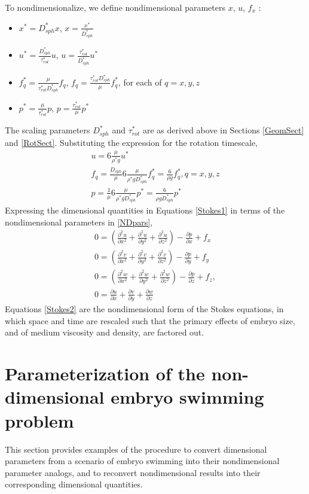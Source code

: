 \documentclass[10pt,a4paper]{article}
\def\non{\nonumber}
\def\p{\partial}
\begin{document}
To nondimensionalize, we define nondimensional parameters $x$, $u$, $f_x$ :
\begin{itemize}
	\item $x^* = D_{sph}^* x$, $x = \frac{x^*}{D_{sph}^*}$
	\item $u^* = \frac{D_{sph}^*}{\tau_{rot}^*} u$, $u = \frac{\tau_{rot}^*}{D_{sph}^*} u^*$
	\item $f_q^* = \frac{\mu}{\tau_{rot}^* D_{sph}^*} f_q$, $f_q = \frac{\tau_{rot}^* D_{sph}^*}{\mu} f_q^*$, for each of $q = x, y, z$
	\item $p^* = \frac{\mu}{\tau_{rot}^*} p$, $p = \frac{\tau_{rot}^*}{\mu} p^*$
\end{itemize}
The scaling parameters $D_{sph}^*$ and $\tau_{rot}^*$ are as derived above in Sections \ref{GeomSect} and \ref{RotSect}.
Substituting the expression for the rotation timescale,
\begin{eqnarray}\label{NDpars}
	u = 6 \frac{\mu}{\rho^* g } u^* \non \\
	f_q = \frac{D_{sph}}{\mu} 6 \frac{\mu}{\rho^* g D_{sph}^*} f_q^* = \frac{6}{\rho g} f_q^*, q = x, y, z \non \\
	p = \frac{1}{\mu} 6 \frac{\mu}{\rho^* g D_{sph}^*} p^* = \frac{6}{\rho g D_{sph}^*} p^*
\end{eqnarray}
Expressing the dimensional quantities in Equations \ref{Stokes1} in terms of the nondimensional parameters in \ref{NDpars}, 
\begin{eqnarray}\label{Stokes2}
	0 = \left( \frac{\p^2 u}{\p x^2}+\frac{\p^2 u}{\p y^2}+\frac{\p^2 u}{\p z^2} \right) - \frac{\p p}{\p x} + f_x \non \\
	0 = \left( \frac{\p^2 v}{\p x^2}+\frac{\p^2 v}{\p y^2}+\frac{\p^2 v}{\p z^2} \right) - \frac{\p p}{\p y} + f_y \non \\
	0 = \left( \frac{\p^2 w}{\p x^2}+\frac{\p^2 w}{\p y^2}+\frac{\p^2 w}{\p z^2} \right) - \frac{\p p}{\p z} + f_z , \non \\
	0 =  \frac{\p u}{\p {x}}+\frac{\p v}{\p {y}}+\frac{\p w}{\p {z}}
\end{eqnarray}
Equations \ref{Stokes2} are the nondimensional form of the Stokes equations, in which space and time are rescaled such that the primary effects of embryo size, and of medium viscosity and density, are factored out.  

\section{Parameterization of the non-dimensional embryo swimming problem}\label{NDparsSect}
This section provides examples of the procedure to convert dimensional parameters from a scenario of embryo swimming into their nondimensional parameter analogs, and to reconvert nondimensional results into their corresponding dimensional quantities.
\end{document}
